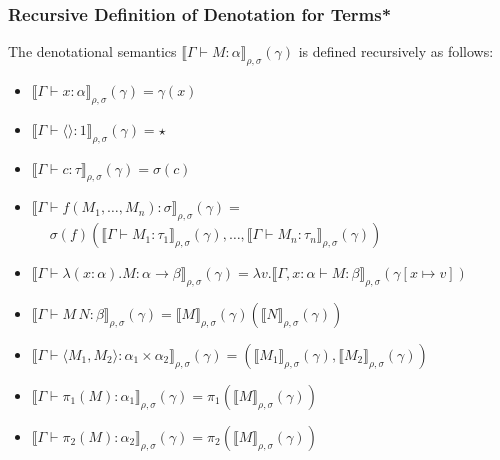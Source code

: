 \documentclass[aspectratio=169]{beamer}
\begin{document}
\begin{frame}
\frametitle{Recursive Definition of Denotation for Terms*}

\pause

The denotational semantics $\llbracket \Gamma \vdash M : \alpha \rrbracket_{\rho,\sigma} (\gamma)$ is defined recursively as follows:

\begin{itemize}
    \pause
    \item $\llbracket \Gamma \vdash x : \alpha \rrbracket_{\rho,\sigma} (\gamma) = \gamma(x)$
    \pause
    \item $\llbracket \Gamma \vdash \langle \rangle : 1 \rrbracket_{\rho,\sigma} (\gamma) = \star$
    \pause
    \item $\llbracket \Gamma \vdash c : \tau \rrbracket_{\rho,\sigma} (\gamma) = \sigma(c)$
    \pause
    \item $\llbracket \Gamma \vdash f(M_1, \ldots, M_n) : \sigma \rrbracket_{\rho,\sigma} (\gamma) =$ $\phantom{.}\quad\sigma(f)(\llbracket \Gamma \vdash M_1 : \tau_1 \rrbracket_{\rho,\sigma} (\gamma), \ldots, \llbracket \Gamma \vdash M_n : \tau_n \rrbracket_{\rho,\sigma} (\gamma))$
    \pause
    \item $\llbracket \Gamma \vdash \lambda (x : \alpha). M : \alpha \rightarrow \beta \rrbracket_{\rho,\sigma} (\gamma) = \lambda v. \llbracket \Gamma, x:\alpha \vdash M : \beta \rrbracket_{\rho,\sigma} (\gamma[x \mapsto v])$
    \pause
    \item $\llbracket \Gamma \vdash M \, N : \beta \rrbracket_{\rho,\sigma} (\gamma) = \llbracket M \rrbracket_{\rho,\sigma}(\gamma)(\llbracket N \rrbracket_{\rho,\sigma}(\gamma))$
    \pause
    \item $\llbracket \Gamma \vdash \langle M_1, M_2 \rangle : \alpha_1 \times \alpha_2 \rrbracket_{\rho,\sigma} (\gamma) = (\llbracket M_1 \rrbracket_{\rho,\sigma}(\gamma), \llbracket M_2 \rrbracket_{\rho,\sigma}(\gamma))$
    \pause
    \item $\llbracket \Gamma \vdash \pi_1(M) : \alpha_1 \rrbracket_{\rho,\sigma} (\gamma) = \pi_1(\llbracket M \rrbracket_{\rho,\sigma}(\gamma))$
    \pause
    \item $\llbracket \Gamma \vdash \pi_2(M) : \alpha_2 \rrbracket_{\rho,\sigma} (\gamma) = \pi_2(\llbracket M \rrbracket_{\rho,\sigma}(\gamma))$
\end{itemize}
\end{frame}
\end{document}
